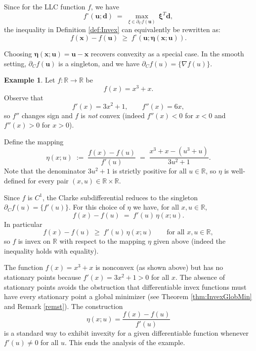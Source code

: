\documentclass{article}
\theoremstyle{definition}
\newtheorem{example}[maar]{Example}
\begin{document}
\vskip10pt
\noindent
Since for the LLC function $f$, we have 
\[
  f^{\circ}(\boldsymbol u;\boldsymbol d) \;=\; \max_{\xi \in \partial_C f(\boldsymbol u)} \, \boldsymbol \xi^{T} \boldsymbol d,
\] the inequality in Definition \ref{def:Invex} can equivalently be rewritten as:
$$f(\boldsymbol x)-f(\boldsymbol u)\;\ge\;f^{\circ}(\boldsymbol u;\boldsymbol\eta(\boldsymbol x;\boldsymbol u)).$$


Choosing $\boldsymbol\eta(\boldsymbol x;\boldsymbol u)=\boldsymbol u-\boldsymbol x$ recovers convexity as a special case.  In the smooth setting, $\partial_C f(\boldsymbol{u})$ is a singleton, and we have $\partial_C f(u)=\{\nabla f(u)\}$.

\begin{example}
Let $f:\mathbb{R}\to\mathbb{R}$ be
\[
  f(x)=x^{3}+x.
\]
Observe that
\[
  f'(x)=3x^{2}+1,\qquad f''(x)=6x,
\]
so $f''$ changes sign and $f$ is \emph{not} convex (indeed $f''(x)<0$ for $x<0$ and $f''(x)>0$ for $x>0$).

Define the mapping
\[
 \eta(x;u)
  \;:=\;
  \frac{f(x)-f(u)}{f'(u)}
  \;=\;
  \frac{x^{3}+x - (u^{3}+u)}{3u^{2}+1}.
\]
Note that the denominator $3u^{2}+1$ is strictly positive for all $u\in\mathbb{R}$, so $\eta$ is well-defined for every pair $(x,u)\in\mathbb{R}\times\mathbb{R}$.

Since $f$ is $C^{1}$, the Clarke subdifferential reduces to the singleton $\partial_C f(u)=\{f'(u)\}$. For this choice of $\eta$ we have, for all $x,u\in\mathbb{R}$,
\[
  f(x)-f(u)
  \;=\; f'(u)\,\eta(x;u).
\]
In particular
\[
  f(x)-f(u)\;\ge\; f'(u)\,\eta(x;u)
  \qquad\text{for all }x,u\in\mathbb{R},
\]
so $f$ is invex on $\mathbb{R}$ with respect to the mapping $\eta$ given above (indeed the inequality holds with equality).

The function $f(x)=x^{3}+x$ is nonconvex (as shown above) but has no stationary points because $f'(x)=3x^{2}+1>0$ for all $x$. The absence of stationary points avoids the obstruction that differentiable invex functions must have every stationary point a global minimizer (see Theorem \ref{thm:InvexGlobMin} and Remark \ref{remst}).
The construction $$\eta(x;u)=\dfrac{f(x)-f(u)}{f'(u)}$$ is a standard way to exhibit invexity for a given differentiable function whenever $f'(u)\neq 0$ for all $u$. This ends the analysis of the example.
\end{example}


\end{document}
